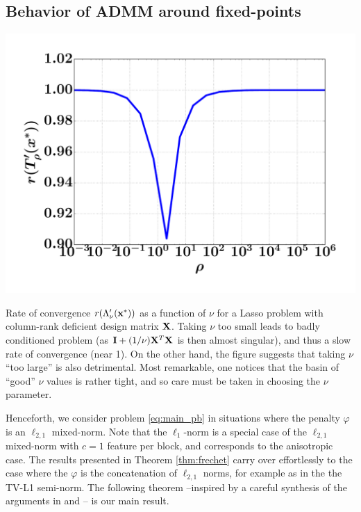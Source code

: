 \subsection{Behavior of ADMM around fixed-points}
\begin{marginfigure}[4cm]
  \label{fig:rates}  
  \includegraphics[width=1.2\linewidth]{figures/lasso_rates.pdf}%
\caption{Rate of convergence $r(\Lambda'_\nu(\mathbf{x}^*))$ as a function of $\nu$
  for a Lasso problem with column-rank deficient design
  matrix $\mathbf{X}$. Taking $\nu$ too small leads
  to badly conditioned problem (as  $\mathbf{I} + (1/\nu)\mathbf{X}^T\mathbf{X}$ is then almost
  singular), and thus a slow rate of convergence (near 1). On the
  other hand, the figure suggests that taking $\nu$ ``too large''
  is also detrimental. Most remarkable, one notices that the basin of
  ``good'' $\nu$ values is rather tight, and so care must be taken in
  choosing the $\nu$ parameter.
}
\end{marginfigure} %

Henceforth, we consider problem \eqref{eq:main_pb} in situations
where the penalty $\varphi$ is an $\ell_{2,1}$
mixed-norm. Note that the $\ell_1$-norm is a special case of the
$\ell_{2,1}$ mixed-norm with $c=1$ feature per block, and corresponds
to the anisotropic case. The results presented in Theorem
\eqref{thm:frechet} carry over effortlessly to the case where the
$\varphi$ is the
  concatenation of $\ell_{2,1}$ norms, for example as in the the TV-L1
  semi-norm. %
The following theorem --inspired by a careful synthesis of
the arguments in \citep{holmes1973} and \citep{bayram2010subband}--
is our main result.

